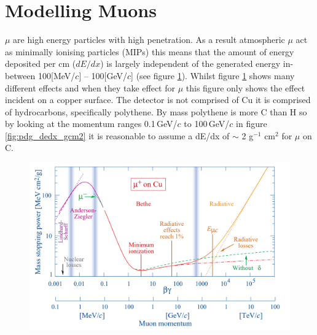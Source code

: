 \section{Modelling Muons}
$\mu$ are high energy particles with high penetration. As a result atmospheric $\mu$ act as minimally ionising particles (MIPs) this means that the amount of energy deposited per cm ($dE/dx$) is largely independent of the generated energy in-between 100[MeV/$c$] -- 100[GeV/$c$] (see figure \ref{fig:pdg_MuonMomentumStopping}). Whilst figure \ref{fig:pdg_MuonMomentumStopping} shows many different effects and when they take effect for $\mu$ this figure only shows the effect incident on a copper surface. The detector is not comprised of Cu it is comprised of hydrocarbons, specifically polythene. By mass polythene is more C than H so by looking at the momentum ranges 0.1\,GeV/$c$ to 100\,GeV/$c$ in figure \ref{fig:pdg_dedx_gcm2} it is reasonable to assume a dE/dx of $\sim$ 2 g$^{-1}$ cm$^2$ for $\mu$ on C. 

\begin{figure}[htbp]
 \centering
 \includegraphics[width=1.0\linewidth]{Chapter4/Figs/Raster/pdg_MuonMomentumStopping.png}
 \label{fig:pdg_MuonMomentumStopping}
\end{figure}

